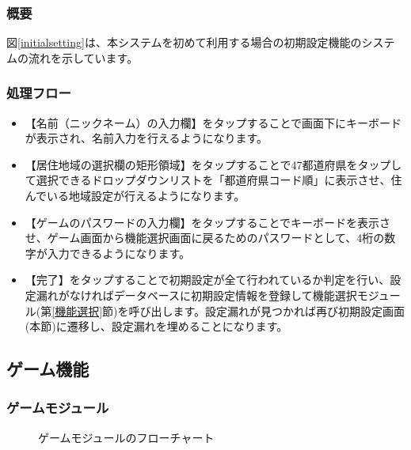 \documentclass[a4j]{jarticle}
\begin{document}
\subsubsection*{概要}
図\ref{initialsetting}は、本システムを初めて利用する場合の初期設定機能のシステムの流れを示しています。


\subsubsection*{処理フロー}
\begin{itemize}
\item 【名前（ニックネーム）の入力欄】をタップすることで画面下にキーボードが表示され、名前入力を行えるようになります。

\item 【居住地域の選択欄の矩形領域】をタップすることで47都道府県をタップして選択できるドロップダウンリストを「都道府県コード順」に表示させ、住んでいる地域設定が行えるようになります。

\item 【ゲームのパスワードの入力欄】をタップすることでキーボードを表示させ、ゲーム画面から機能選択画面に戻るためのパスワードとして、4桁の数字が入力できるようになります。

\item 【完了】をタップすることで初期設定が全て行われているか判定を行い、設定漏れがなければデータベースに初期設定情報を登録して機能選択モジュール(第\ref{機能選択}節)を呼び出します。設定漏れが見つかれば再び初期設定画面(本節)に遷移し、設定漏れを埋めることになります。
\end{itemize}

\newpage


\subsection{ゲーム機能}
\subsubsection{ゲームモジュール\label{ゲーム}}
\begin{figure}[H]
    \begin{center}
    \caption {ゲームモジュールのフローチャート}
    \label{game}
    \end{center}
\end{figure}
\end{document}
